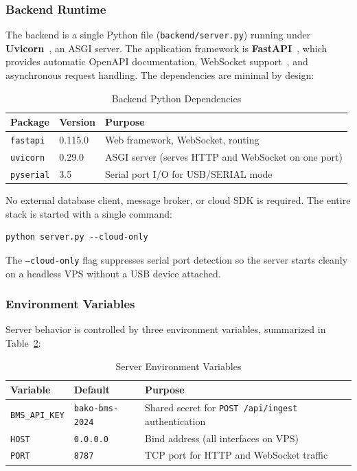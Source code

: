 \subsubsection{Backend Runtime}

The backend is a single Python file (\texttt{backend/server.py}) running under \textbf{Uvicorn}~\cite{uvicorn}, an ASGI server. The application framework is \textbf{FastAPI}~\cite{fastapi}, which provides automatic OpenAPI documentation, WebSocket support~\cite{rfc6455}, and asynchronous request handling. The dependencies are minimal by design:

\begin{table}[h]
    \centering
    \caption{Backend Python Dependencies}
    \label{tab:backend-deps}
    \begin{tabular}{llp{7cm}}
        \toprule
        \textbf{Package} & \textbf{Version} & \textbf{Purpose} \\
        \midrule
        \texttt{fastapi}  & 0.115.0 & Web framework, WebSocket, routing \\
        \texttt{uvicorn}  & 0.29.0  & ASGI server (serves HTTP and WebSocket on one port) \\
        \texttt{pyserial} & 3.5     & Serial port I/O for USB/SERIAL mode \\
        \bottomrule
    \end{tabular}
\end{table}

No external database client, message broker, or cloud SDK is required. The entire stack is started with a single command:

\begin{verbatim}
python server.py --cloud-only
\end{verbatim}

The \texttt{--cloud-only} flag suppresses serial port detection so the server starts cleanly on a headless VPS without a USB device attached.

\subsubsection{Environment Variables}

Server behavior is controlled by three environment variables, summarized in Table~\ref{tab:env-vars}:

\begin{table}[h]
    \centering
    \caption{Server Environment Variables}
    \label{tab:env-vars}
    \begin{tabular}{lll}
        \toprule
        \textbf{Variable} & \textbf{Default} & \textbf{Purpose} \\
        \midrule
        \texttt{BMS\_API\_KEY} & \texttt{bako-bms-2024} & Shared secret for \texttt{POST /api/ingest} authentication \\
        \texttt{HOST}          & \texttt{0.0.0.0}       & Bind address (all interfaces on VPS) \\
        \texttt{PORT}          & \texttt{8787}          & TCP port for HTTP and WebSocket traffic \\
        \bottomrule
    \end{tabular}
\end{table}

